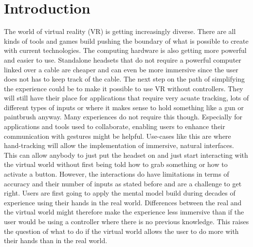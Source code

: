 
\chapter{Introduction}
The world of virtual reality (VR) is getting increasingly diverse. There are all kinds of tools and games build pushing the boundary of what is possible to create with current technologies. The computing hardware is also getting more powerful and easier to use. Standalone headsets that do not require a powerful computer linked over a cable are cheaper and can even be more immersive since the user does not has to keep track of the cable. The next step on the path of simplifying the experience could be to make it possible to use VR without controllers. They will still have their place for applications that require very acuate tracking, lots of different types of inputs or where it makes sense to hold something like a gun or paintbrush anyway. Many experiences do not require this though. Especially for applications and tools used to collaborate, enabling users to enhance their communication with gestures might be helpful. Use-cases like this are where hand-tracking will allow the implementation of immersive, natural interfaces. This can allow anybody to just put the headset on and just start interacting with the virtual world without first being told how to grab something or how to activate a button. However, the interactions do have limitations in terms of accuracy and their number of inputs as stated before and are a challenge to get right. Users are first going to apply the mental model build during decades of experience using their hands in the real world. Differences between the real and the virtual world might therefore make the experience less immersive than if the user would be using a controller where there is no previous knowledge. This raises the question of what to do if the virtual world allows the user to do more with their hands than in the real world. 


